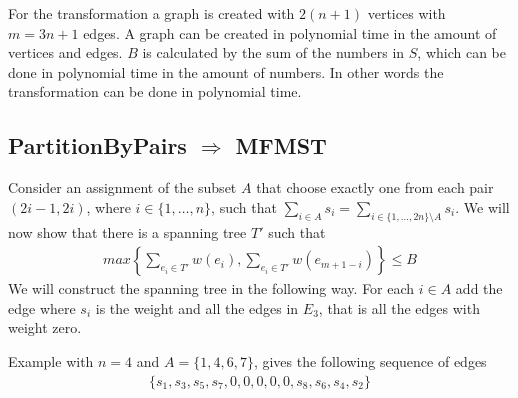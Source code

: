 For the transformation a graph is created with $2(n+1)$ vertices with $m = 3n+1$ edges. A graph can be created in polynomial time in the amount of vertices and edges. $B$ is calculated by the sum of the numbers in $S$, which can be done in polynomial time in the amount of numbers. In other words the transformation can be done in polynomial time.

\subsection{PartitionByPairs $\Rightarrow$ MFMST}
Consider an assignment of the subset $A$ that choose exactly one from each pair $(2i-1,2i)$, where $i \in \{1,\ldots,n\}$, such that $\sum_{i \in A} s_i = \sum_{i \in \{1,\ldots,2n\}\setminus A} s_i$.
We will now show that there is a spanning tree $T'$ such that
\begin{align*}
    max \left\{ \sum_{e_i \in T'} w(e_i), \sum_{e_i \in T'} w(e_{m+1-i}) \right\} \leq B
\end{align*}
We will construct the spanning tree in the following way. For each $i \in A$ add the edge where $s_i$ is the weight and all the edges in $E_3$, that is all the edges with weight zero.

Example with $n = 4$ and $A = \{1,4,6,7\}$, gives the following sequence of edges
\begin{align*}
    \{s_1, s_3, s_5, s_7, 0, 0, 0, 0, 0, s_8, s_6, s_4, s_2\}
\end{align*}

